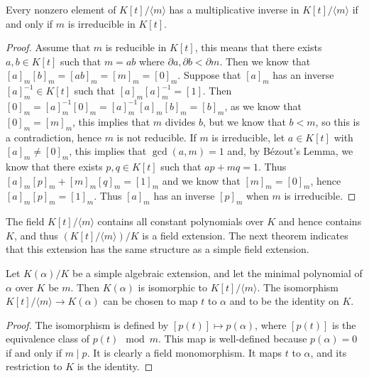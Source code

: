 \begin{theorem} \label{thm:irreducible-mod-field}
	Every nonzero element of $K[t] /\langle m\rangle$ has a multiplicative inverse in $K[t] /\langle m\rangle$ if and only if $m$ is irreducible in $K[t]$.
\end{theorem}

\begin{proof}
	Assume that \(m\) is reducible in \(K[t]\), this means that there exists \(a,b \in K[t]\) such that \(m = ab\) where \(\partial a,\partial b < \partial m\). Then we know that \([a]_m[b]_m = [ab]_m = [m]_m = [0]_m\). Suppose that \([a]_m\) has an inverse \([a]_m^{-1} \in K[t]\) such that \([a]_m[a]_m^{-1} = [1]\). Then \([0]_m = [a]_m^{-1}[0]_m = [a]_m^{-1}[a]_m[b]_m = [b]_m\), as we know that \([0]_m = [m]_m\), this implies that \(m\) divides \(b\), but we know that \(b < m\), so this is a contradiction, hence \(m\) is not reducible. 
	If \(m\) is irreducible, let \(a \in K[t]\) with \([a]_m \neq [0]_m\), this implies that \(\gcd(a,m)=1\) and, by Bézout's Lemma, we know that there exists \(p,q \in K[t]\) such that \(ap + mq = 1\). Thus \([a]_m[p]_m + [m]_m[q]_m = [1]_m\) and we know that \([m]_m = [0]_m\), hence \([a]_m[p]_m = [1]_m\). Thus \([a]_m\) has an inverse \([p]_m\) when \(m\) is irreducible.
\end{proof}

The field $K[t] / \langle m \rangle$ contains all constant polynomials over $K$ and hence contains $K$, and thus $\left(K[t] / \langle m \rangle \right) / K$ is a field extension. The next theorem indicates that this extension has the same structure as a simple field extension.

\begin{theorem}
    Let $K(\alpha) / K$ be a simple algebraic extension, and let the minimal polynomial of $\alpha$ over $K$ be $m$. Then $K(\alpha)$ is isomorphic to $K[t] /\langle m\rangle$. The isomorphism $K[t] /\langle m\rangle \rightarrow K(\alpha)$ can be chosen to map $t$ to $\alpha$ and to be the identity on $K$.
\end{theorem}

\begin{proof}
The isomorphism is defined by $[p(t)] \mapsto p(\alpha)$, where $[p(t)]$ is the equivalence class of $p(t)\mod m$. This map is well-defined because $p(\alpha)=0$ if and only if $m \mid p$. It is clearly a field monomorphism. It maps $t$ to $\alpha$, and its restriction to $K$ is the identity.
\end{proof}

